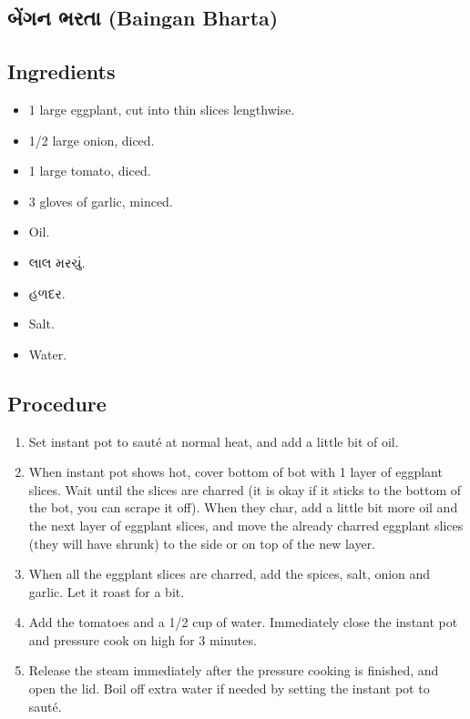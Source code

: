 \documentclass[../../recipes.tex]{subfiles}
\begin{document}
\begin{gujarati}

\chapter{બેંગન ભરતા (Baingan Bharta)}

\section*{Ingredients}

\begin{itemize}
    \item 1 large eggplant, cut into thin slices lengthwise.
    \item 1/2 large onion, diced.
    \item 1 large tomato, diced.
    \item 3 gloves of garlic, minced.
    \item Oil.
    \item લાલ મરચું.
    \item હળદર.
    \item Salt.
    \item Water.
\end{itemize}

\noindent
\section*{Procedure}

\begin{enumerate}
    \item Set instant pot to sauté at normal heat, and add a little bit of oil.
    \item When instant pot shows hot, cover bottom of bot with 1 layer of eggplant slices. Wait until the slices are charred (it is okay if it sticks to the bottom of the bot, you can scrape it off). When they char, add a little bit more oil and the next layer of eggplant slices, and move the already charred eggplant slices (they will have shrunk) to the side or on top of the new layer.
    \item When all the eggplant slices are charred, add the spices, salt, onion and garlic. Let it roast for a bit.
    \item Add the tomatoes and a 1/2 cup of water. Immediately close the instant pot and pressure cook on high for 3 minutes.
    \item Release the steam immediately after the pressure cooking is finished, and open the lid. Boil off extra water if needed by setting the instant pot to sauté.
\end{enumerate}

\end{gujarati}
\end{document}
